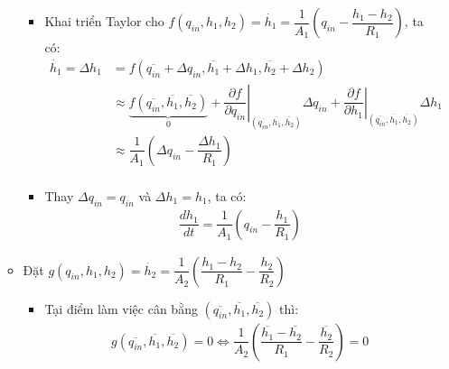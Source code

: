 \documentclass[12pt,a4paper]{article}
\begin{document}
\begin{enumerate}[\it a.]
\begin{itemize}
\begin{itemize}
                            \item Khai triển Taylor cho $f\left({q_{in}, h_1, h_2}\right) = \dot{h_1} = \dfrac{1}{A_1} \left({q_{in} - \dfrac{h_1 - h_2}{R_1}}\right)$, ta có:
                                \begin{align}
                                    \dot{h_1} = \Delta h_1 & = f\left({\overline{q_{in}} + \Delta q_{in}, \overline{h_1} + \Delta h_1, \overline{h_2} + \Delta h_2}\right) \\
                                    & \approx \underbrace{f\left({ \overline{q_{in}}, \overline{h_1}, \overline{h_2}}\right)}_{0} + \left.\dfrac{\partial f}{\partial q_{in}}\right|_{ \left({ \overline{q_{in}}, \overline{h_1}, \overline{h_2}}\right)} \Delta q_{in} + \left.\dfrac{\partial f}{\partial h_1}\right|_{ \left({ \overline{q_{in}}, \overline{h_1}, \overline{h_2}}\right)} \Delta h_1\\
                                    & \approx \dfrac{1}{A_1} \left({\Delta q_{in} -  \dfrac{\Delta h_1}{R_1}}\right)\\
                                \end{align}

                            \item Thay $\Delta q_{in} = q_{in}$ và $\Delta h_1 = h_1$, ta có:
                                \begin{align}
                                    \dfrac{d h_1}{dt} = \dfrac{1}{A_1} \left({q_{in} - \dfrac{h_1}{R_1}}\right)
                                \end{align}
                        \end{itemize}

                    \item Đặt $g\left({q_{in}, h_1, h_2}\right) = \dot{h_2} = \dfrac{1}{A_2} \left({\dfrac{h_1 - h_2}{R_1} - \dfrac{h_2}{R_2}}\right)$
                        \begin{itemize}
                            \item Tại điểm làm việc cân bằng $\left({ \overline{q_{in}}, \overline{h_1}, \overline{h_2}}\right)$ thì:
                                \begin{align}
                                    g\left({ \overline{q_{in}}, \overline{h_1}, \overline{h_2}}\right) = 0 \Longleftrightarrow \dfrac{1}{A_2} \left({\dfrac{\overline{h_1} - \overline{h_2}}{R_1} - \dfrac{\overline{h_2}}{R_2}}\right) = 0
                                \end{align}


\end{itemize}
\end{itemize}
\end{enumerate}
\end{document}
